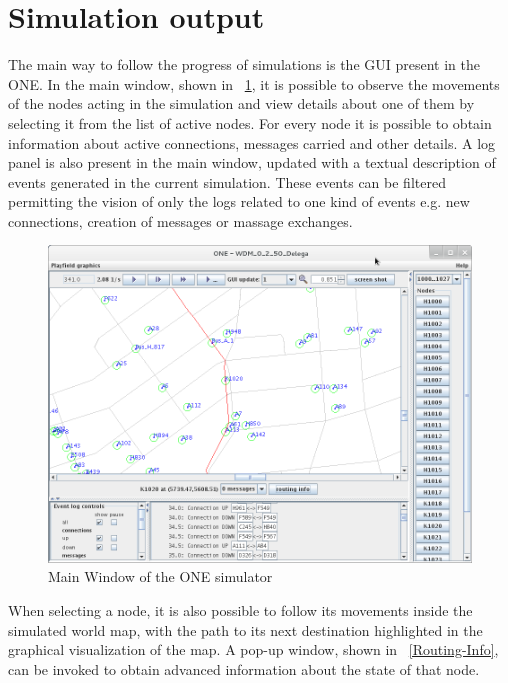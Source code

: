 \section{Simulation output}
The main way to follow the progress of simulations is the GUI present in the ONE. In the main window, shown in \figurename~\ref{Schermata-ONE}, it is possible to observe the movements of the nodes acting in the simulation and view details about one of them by selecting it from the list of active nodes. For every node it is possible to obtain information about active connections, messages carried and other details. A log panel is also present in the main window, updated with a textual description of events generated in the current simulation. These events can be filtered permitting the vision of only the logs related to one kind of events e.g. new connections, creation of messages or massage exchanges.
\\
\begin{figure}[htpb]
  \begin{center}
    \includegraphics[scale=0.4]{5-simulatore/img/Schermata-ONE.png}
    \caption{Main Window of the ONE simulator}    
    \label{Schermata-ONE}
  \end{center}
\end{figure}

When selecting a node, it is also possible to follow its movements inside the simulated world map, with the path to its next destination highlighted in the graphical visualization of the map. A pop-up window, shown in \figurename~\ref{Routing-Info}, can be invoked to obtain advanced information about the state of that node.
\\

